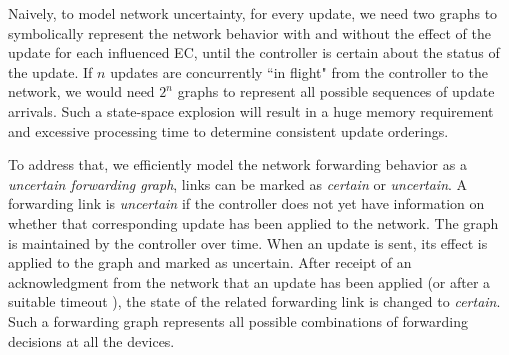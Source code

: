 Naively, to model network uncertainty, for every update, we need two graphs to symbolically represent the network behavior with and without the effect of the update for each influenced EC, until the controller is certain about the status of the update.
If $n$ updates are concurrently ``in flight" from the controller to the network, we would need $2^n$ graphs to represent all possible sequences of update arrivals.
Such a state-space explosion will result in a huge memory requirement and excessive processing time to determine consistent update orderings.

To address that, we efficiently model the network forwarding behavior %
as a \emph{uncertain forwarding graph},  links can be marked as {\em certain} or {\em uncertain}.
A forwarding link is {\em uncertain} if the controller does not yet have information on whether 
that corresponding update has been applied to the network.
The graph is maintained by the controller over time. 
When an update is sent, its effect is applied to the graph and marked as uncertain.
After receipt of an acknowledgment from the network that an update has been applied
(or after a suitable timeout%
), the state of the related forwarding link is changed to {\em certain}.
Such a forwarding graph represents all possible combinations
of forwarding decisions at all the devices.

